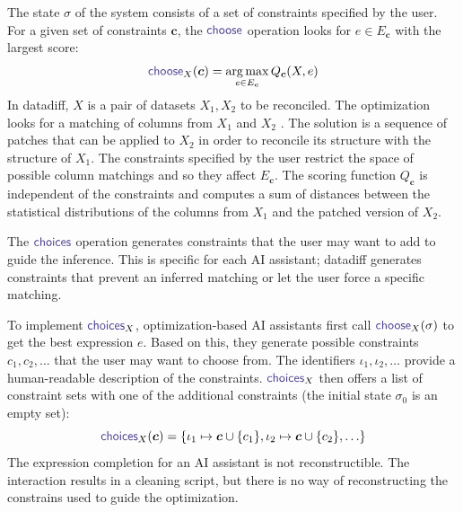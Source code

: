 \documentclass[nonacm,anonymous,sigplan,screen]{acmart}
\newcommand{\ident}[1]{\textsf{\color{DarkSlateBlue}{#1}}}
\newcommand{\sigmaN}{\sigma_0}
\newcommand{\select}{\textnormal{\ident{choose}}}
\newcommand{\choices}{\textnormal{\ident{choices}}}
\DeclareMathOperator{\argmax}{arg\,max}
\newcommand{\todo}[1]{\textcolor{red}{\textbf{TODO: #1}}}
\begin{document}
The state $\sigma$ of the system consists of a set of constraints specified by the user.
For a given set of constraints $\boldsymbol{c}$, the $\select$ operation looks
for $e\in E_{\boldsymbol{c}}$ with the largest score:
\[
\select_X(\boldsymbol{c}) = \argmax_{e \in E_{\boldsymbol{c}}} Q_{\boldsymbol{c}}(X, e)
\]
In datadiff, $X$ is a pair of datasets $X_1, X_2$ to be reconciled. The optimization
looks for a matching of columns from $X_1$ and $X_2$ \cite{sutton-2018-datadiff}. The solution
is a sequence of patches that can be applied to
$X_2$ in order to reconcile its structure with the structure of $X_1$.
The constraints specified by the user restrict the space of possible column matchings and so they
affect $E_{\boldsymbol{c}}$. The scoring function $Q_{\boldsymbol{c}}$ is independent of
the constraints and computes a sum of distances between the statistical distributions of the
columns from $X_1$ and the patched version of $X_2$.

The $\choices$ operation generates constraints that the user may want to add to guide the
inference. This is specific for each AI assistant; datadiff generates constraints that prevent
an inferred matching or let the user force a specific matching.

To implement $\choices_X$, optimization-based AI assistants first call $\select_X(\sigma)$ to
get the best expression $e$. Based on this, they generate possible constraints $c_1, c_2, \ldots$
that the user may want to choose from. The identifiers $\iota_1,\iota_2, \ldots$ provide a
human-readable description of the constraints. $\choices_X$ then offers a list of constraint sets
with one of the additional constraints (the initial state $\sigmaN$ is an empty set):
\[
\choices_X(\boldsymbol{c}) = \{\iota_1 \mapsto \boldsymbol{c}\cup\{ c_1 \}, \iota_2\mapsto\boldsymbol{c}\cup\{ c_2 \}, \ldots\}
\]
The expression completion for an AI assistant is not reconstructible.
The inter\-action results in a cleaning script, but there is no way of reconstructing
the constrains used to guide the optimization.

\end{document}
